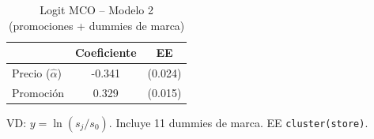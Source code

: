 \begin{table}[H]
\centering
\caption{Logit MCO -- Modelo 2 (promociones + dummies de marca)}
\begin{tabular}{lcc}
\toprule
& Coeficiente & EE \\
\midrule
Precio ($\hat{\alpha}$) & -0.341 & (0.024) \\
Promoci\'on & 0.329 & (0.015) \\
\bottomrule
\end{tabular}

\smallskip
{\footnotesize\begin{minipage}{0.92\linewidth}VD: $y=\ln(s_j/s_0)$. Incluye 11 dummies de marca. EE \texttt{cluster(store)}.\end{minipage}}
\end{table}
